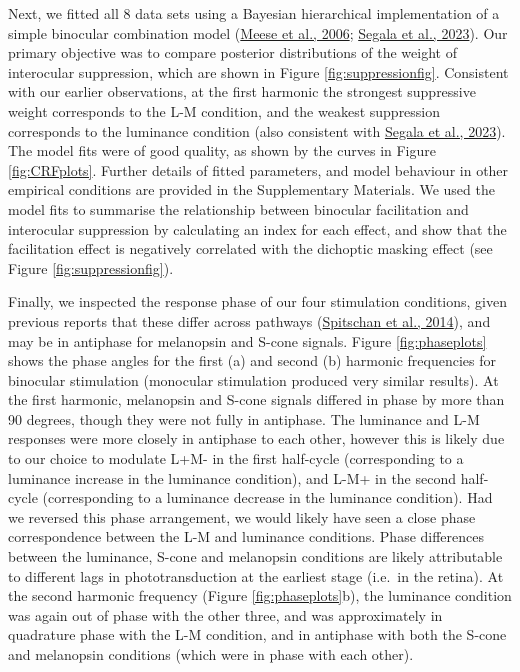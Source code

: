 \documentclass[
]{article}
\begin{document}
Next, we fitted all 8 data sets using a Bayesian hierarchical implementation of a simple binocular combination model (\protect\hyperlink{ref-Meese2006}{Meese et al., 2006}; \protect\hyperlink{ref-Segala2023}{Segala et al., 2023}). Our primary objective was to compare posterior distributions of the weight of interocular suppression, which are shown in Figure \ref{fig:suppressionfig}. Consistent with our earlier observations, at the first harmonic the strongest suppressive weight corresponds to the L-M condition, and the weakest suppression corresponds to the luminance condition (also consistent with \protect\hyperlink{ref-Segala2023}{Segala et al., 2023}). The model fits were of good quality, as shown by the curves in Figure \ref{fig:CRFplots}. Further details of fitted parameters, and model behaviour in other empirical conditions are provided in the Supplementary Materials. We used the model fits to summarise the relationship between binocular facilitation and interocular suppression by calculating an index for each effect, and show that the facilitation effect is negatively correlated with the dichoptic masking effect (see Figure \ref{fig:suppressionfig}).

Finally, we inspected the response phase of our four stimulation conditions, given previous reports that these differ across pathways (\protect\hyperlink{ref-Spitschan2014}{Spitschan et al., 2014}), and may be in antiphase for melanopsin and S-cone signals. Figure \ref{fig:phaseplots} shows the phase angles for the first (a) and second (b) harmonic frequencies for binocular stimulation (monocular stimulation produced very similar results). At the first harmonic, melanopsin and S-cone signals differed in phase by more than 90 degrees, though they were not fully in antiphase. The luminance and L-M responses were more closely in antiphase to each other, however this is likely due to our choice to modulate L+M- in the first half-cycle (corresponding to a luminance increase in the luminance condition), and L-M+ in the second half-cycle (corresponding to a luminance decrease in the luminance condition). Had we reversed this phase arrangement, we would likely have seen a close phase correspondence between the L-M and luminance conditions. Phase differences between the luminance, S-cone and melanopsin conditions are likely attributable to different lags in phototransduction at the earliest stage (i.e.~in the retina). At the second harmonic frequency (Figure \ref{fig:phaseplots}b), the luminance condition was again out of phase with the other three, and was approximately in quadrature phase with the L-M condition, and in antiphase with both the S-cone and melanopsin conditions (which were in phase with each other).
\end{document}
